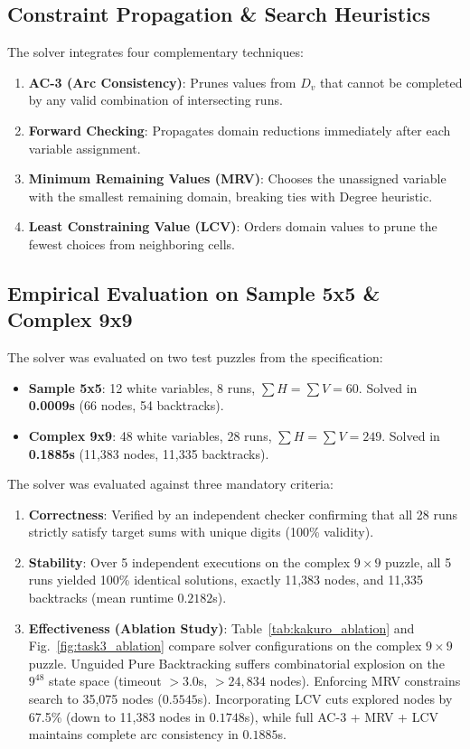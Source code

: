 \documentclass[conference]{IEEEtran}
\begin{document}
\subsection{Constraint Propagation \& Search Heuristics}
The solver integrates four complementary techniques:
\begin{enumerate}
    \item \textbf{AC-3 (Arc Consistency)}: Prunes values from $D_v$ that cannot be completed by any valid combination of intersecting runs.
    \item \textbf{Forward Checking}: Propagates domain reductions immediately after each variable assignment.
    \item \textbf{Minimum Remaining Values (MRV)}: Chooses the unassigned variable with the smallest remaining domain, breaking ties with Degree heuristic.
    \item \textbf{Least Constraining Value (LCV)}: Orders domain values to prune the fewest choices from neighboring cells.
\end{enumerate}

\subsection{Empirical Evaluation on Sample 5x5 \& Complex 9x9}
The solver was evaluated on two test puzzles from the specification:
\begin{itemize}
    \item \textbf{Sample 5x5}: 12 white variables, 8 runs, $\sum H = \sum V = 60$. Solved in \textbf{0.0009s} (66 nodes, 54 backtracks).
    \item \textbf{Complex 9x9}: 48 white variables, 28 runs, $\sum H = \sum V = 249$. Solved in \textbf{0.1885s} (11,383 nodes, 11,335 backtracks).
\end{itemize}

The solver was evaluated against three mandatory criteria:
\begin{enumerate}
    \item \textbf{Correctness}: Verified by an independent checker confirming that all 28 runs strictly satisfy target sums with unique digits (100\% validity).
    \item \textbf{Stability}: Over 5 independent executions on the complex $9 \times 9$ puzzle, all 5 runs yielded 100\% identical solutions, exactly 11,383 nodes, and 11,335 backtracks (mean runtime $0.2182$s).
    \item \textbf{Effectiveness (Ablation Study)}: Table~\ref{tab:kakuro_ablation} and Fig.~\ref{fig:task3_ablation} compare solver configurations on the complex $9 \times 9$ puzzle. Unguided Pure Backtracking suffers combinatorial explosion on the $9^{48}$ state space (timeout $>3.0$s, $>24,834$ nodes). Enforcing MRV constrains search to 35,075 nodes ($0.5545$s). Incorporating LCV cuts explored nodes by 67.5\% (down to 11,383 nodes in $0.1748$s), while full AC-3 + MRV + LCV maintains complete arc consistency in $0.1885$s.
\end{enumerate}
\end{document}
